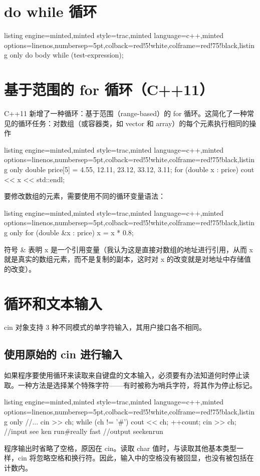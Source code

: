 \section{do while 循环}
\begin{tcblisting}{listing engine=minted,minted style=trac,minted language=c++,minted options={linenos,numbersep=5pt},colback=red!5!white,colframe=red!75!black,listing only}
	do
		body
	while (test-expression);
\end{tcblisting}
\section{基于范围的 for 循环（C++11）}
C++11 新增了一种循环：基于范围（range-based）的 for 循环。这简化了一种常见的循环任务：对数组（或容器类，如 vector 和 array）的每个元素执行相同的操作
\begin{tcblisting}{listing engine=minted,minted style=trac,minted language=c++,minted options={linenos,numbersep=5pt},colback=red!5!white,colframe=red!75!black,listing only}
	double price[5] = {4.55, 12.11, 23.12, 33.12, 3.11};
	for (double x : price)
		cout << x << std::endl;
\end{tcblisting}
要修改数组的元素，需要使用不同的循环变量语法：
\begin{tcblisting}{listing engine=minted,minted style=trac,minted language=c++,minted options={linenos,numbersep=5pt},colback=red!5!white,colframe=red!75!black,listing only}
	for (double &x : price)
		x = x * 0.8;
\end{tcblisting}
符号 \& 表明 x 是一个引用变量（我认为这是直接对数组的地址进行引用，从而 x 就是真实的数组元素，而不是复制的副本，这时对 x 的改变就是对地址中存储值的改变）。
\section{循环和文本输入}
cin 对象支持 3 种不同模式的单字符输入，其用户接口各不相同。
\subsection{使用原始的 cin 进行输入}
如果程序要使用循环来读取来自键盘的文本输入，必须要有办法知道何时停止读取。一种方法是选择某个特殊字符——有时被称为哨兵字符，将其作为停止标记。
\begin{tcblisting}{listing engine=minted,minted style=trac,minted language=c++,minted options={linenos,numbersep=5pt},colback=red!5!white,colframe=red!75!black,listing only}
	//...
	cin >> ch;
	while (ch != '#')
	{
		cout << ch;
		++count;
		cin >> ch;
	}
//input
see ken run#really fast
//output
seekenrun
\end{tcblisting}
程序输出时省略了空格，原因在 cin。读取 char 值时，与读取其他基本类型一样，cin 将忽略空格和换行符。因此，输入中的空格没有被回显，也没有被包括在计数内。


